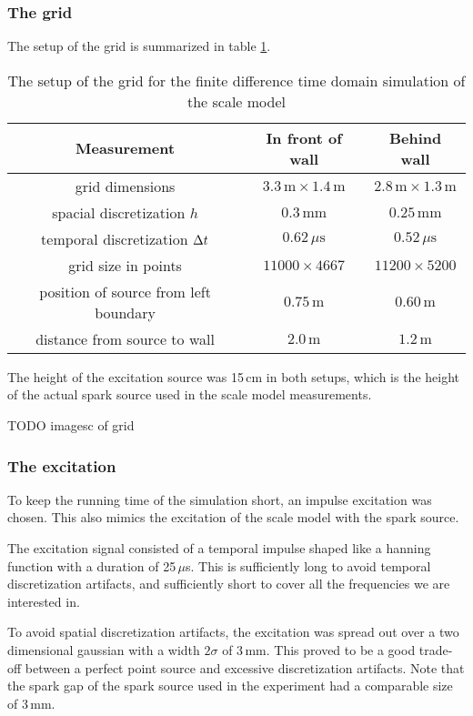 \subsubsection*{The grid}
The setup of the grid is summarized in table \ref{gridSetup}.


\begin{table}[htb]
\begin{center}
\caption{The setup of the grid for the finite difference time domain simulation of the scale model\label{gridSetup}}
\begin{tabular}{c|c|c}
Measurement&	In front of wall&	Behind wall\\\hline
grid dimensions&
	$3.3\,\mathrm{m} \times 1.4\,\mathrm{m}$&
	$2.8\,\mathrm{m} \times 1.3\,\mathrm{m}$\\
spacial discretization $h$&
	$0.3\,\mathrm{mm}$&
	$0.25\,\mathrm{mm}$\\
temporal discretization $\Delta t$&
	$0.62\,\mu\mathrm{s}$&
	$0.52\,\mu\mathrm{s}$\\
grid size in points&
	$11000 \times 4667$&
	$11200 \times 5200$\\
position of source from left boundary&
	$0.75\,\mathrm{m}$&
	$0.60\,\mathrm{m}$\\
distance from source to wall&
	$2.0\,\mathrm{m}$&
	$1.2\,\mathrm{m}$\\
\end{tabular}
\end{center}
\end{table}

The height of the excitation source was 15\,cm in both setups, which is the height of the actual spark source used in the scale model measurements.

TODO imagesc of grid

\subsubsection*{The excitation}
To keep the running time of the simulation short, an impulse excitation was chosen. This also mimics the excitation of the scale model with the spark source.

The excitation signal consisted of a temporal impulse shaped like a hanning function with a duration of 25\,$\mu$s. This is sufficiently long to avoid temporal discretization artifacts, and sufficiently short to cover all the frequencies we are interested in.

To avoid spatial discretization artifacts, the excitation was spread out over a two dimensional gaussian with a width $2\sigma$ of 3\,mm. This proved to be a good trade-off between a perfect point source and excessive discretization artifacts. Note that the spark gap of the spark source used in the experiment had a comparable size of 3\,mm.

